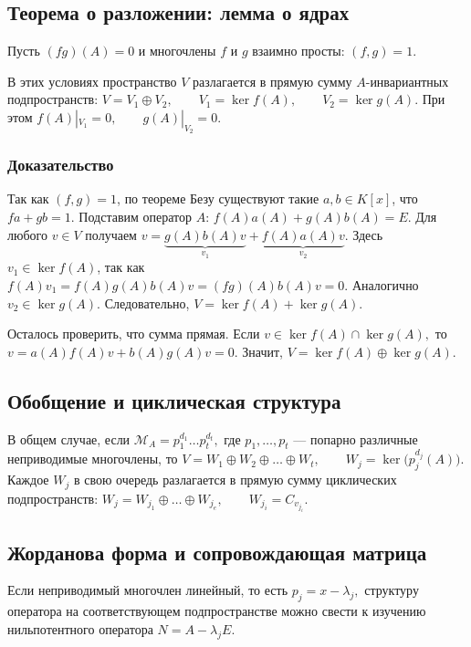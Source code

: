 \subsection{Теорема о разложении: лемма о ядрах}

Пусть $(fg)(A) = 0$ и многочлены $f$ и $g$ взаимно просты: $(f,g) = 1.$

\begin{Proposition}{}{}
	В этих условиях пространство $V$ разлагается в прямую сумму $A$-инвариантных подпространств: $V = V_1 \oplus V_2, \qquad V_1 = \ker f(A), \qquad V_2 = \ker g(A).$
	При этом $f(A)|_{V_1} = 0, \qquad g(A)|_{V_2} = 0.$
\end{Proposition}

\subsubsection*{Доказательство}

Так как $(f,g) = 1$, по теореме Безу существуют такие $a,b \in K[x]$, что $fa + gb = 1.$
Подставим оператор $A$: $f(A)a(A) + g(A)b(A) = E.$
Для любого $v \in V$ получаем $v = \underbrace{g(A)b(A)v}_{v_1} + \underbrace{f(A)a(A)v}_{v_2}.$
Здесь $v_1 \in \ker f(A)$, так как $f(A)v_1 = f(A)g(A)b(A)v = (fg)(A)b(A)v = 0.$
Аналогично $v_2 \in \ker g(A)$. Следовательно, $V = \ker f(A) + \ker g(A).$

Осталось проверить, что сумма прямая. Если $v \in \ker f(A) \cap \ker g(A),$
то $v = a(A)f(A)v + b(A)g(A)v = 0.$
Значит, $V = \ker f(A) \oplus \ker g(A).$

\subsection{Обобщение и циклическая структура}

В общем случае, если $\mathcal{M}_A = p_1^{d_1} \dots p_t^{d_t},$
где $p_1,\dots,p_t$ — попарно различные неприводимые многочлены, то $V = W_1 \oplus W_2 \oplus \dots \oplus W_t, \qquad W_j = \ker\bigl(p_j^{d_j}(A)\bigr).$
Каждое $W_j$ в свою очередь разлагается в прямую сумму циклических подпространств: $W_j = W_{j_1} \oplus \dots \oplus W_{j_e}, \qquad W_{j_i} = C_{v_{j_i}}.$

\subsection{Жорданова форма и сопровождающая матрица}

Если неприводимый многочлен линейный, то есть $p_j = x - \lambda_j,$
структуру оператора на соответствующем подпространстве можно свести к изучению нильпотентного оператора $N = A - \lambda_j E.$

